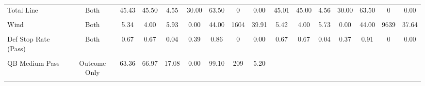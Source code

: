 \documentclass[
]{article}
\begin{document}
\begin{table}[!h]
{\begin{threeparttable}
\begin{tabular}[t]{lccccccccccccccc}
\addlinespace
Total Line & Both & 45.43 & 45.50 & 4.55 & 30.00 & 63.50 & 0 & 0.00 & 45.01 & 45.00 & 4.56 & 30.00 & 63.50 & 0 & 0.00\\
\cellcolor{gray!10}{Temperature} & \cellcolor{gray!10}{Both} & \cellcolor{gray!10}{60.84} & \cellcolor{gray!10}{70.00} & \cellcolor{gray!10}{15.35} & \cellcolor{gray!10}{6.00} & \cellcolor{gray!10}{93.00} & \cellcolor{gray!10}{0} & \cellcolor{gray!10}{0.00} & \cellcolor{gray!10}{61.73} & \cellcolor{gray!10}{70.00} & \cellcolor{gray!10}{15.14} & \cellcolor{gray!10}{6.00} & \cellcolor{gray!10}{97.00} & \cellcolor{gray!10}{0} & \cellcolor{gray!10}{0.00}\\
Wind & Both & 5.34 & 4.00 & 5.93 & 0.00 & 44.00 & 1604 & 39.91 & 5.42 & 4.00 & 5.73 & 0.00 & 44.00 & 9639 & 37.64\\
\cellcolor{gray!10}{Def Stop Rate (Run)} & \cellcolor{gray!10}{Both} & \cellcolor{gray!10}{0.75} & \cellcolor{gray!10}{0.75} & \cellcolor{gray!10}{0.04} & \cellcolor{gray!10}{0.47} & \cellcolor{gray!10}{1.00} & \cellcolor{gray!10}{0} & \cellcolor{gray!10}{0.00} & \cellcolor{gray!10}{0.75} & \cellcolor{gray!10}{0.75} & \cellcolor{gray!10}{0.05} & \cellcolor{gray!10}{0.47} & \cellcolor{gray!10}{1.00} & \cellcolor{gray!10}{0} & \cellcolor{gray!10}{0.00}\\
Def Stop Rate (Pass) & Both & 0.67 & 0.67 & 0.04 & 0.39 & 0.86 & 0 & 0.00 & 0.67 & 0.67 & 0.04 & 0.37 & 0.91 & 0 & 0.00\\
\addlinespace
\cellcolor{gray!10}{QB Short Pass} & \cellcolor{gray!10}{Outcome Only} & \cellcolor{gray!10}{62.06} & \cellcolor{gray!10}{64.84} & \cellcolor{gray!10}{13.90} & \cellcolor{gray!10}{0.00} & \cellcolor{gray!10}{90.20} & \cellcolor{gray!10}{164} & \cellcolor{gray!10}{4.08} & \cellcolor{gray!10}{} & \cellcolor{gray!10}{} & \cellcolor{gray!10}{} & \cellcolor{gray!10}{} & \cellcolor{gray!10}{} & \cellcolor{gray!10}{} & \cellcolor{gray!10}{}\\
QB Medium Pass & Outcome Only & 63.36 & 66.97 & 17.08 & 0.00 & 99.10 & 209 & 5.20 &  &  &  &  &  &  & \\
\cellcolor{gray!10}{QB Deep Pass} & \cellcolor{gray!10}{Outcome Only} & \cellcolor{gray!10}{64.38} & \cellcolor{gray!10}{68.19} & \cellcolor{gray!10}{18.05} & \cellcolor{gray!10}{0.00} & \cellcolor{gray!10}{96.40} & \cellcolor{gray!10}{220} & \cellcolor{gray!10}{5.47} & \cellcolor{gray!10}{} & \cellcolor{gray!10}{} & \cellcolor{gray!10}{} & \cellcolor{gray!10}{} & \cellcolor{gray!10}{} & \cellcolor{gray!10}{} & \cellcolor{gray!10}{}\\

\end{tabular}
\end{threeparttable}}
\end{table}
\end{document}
